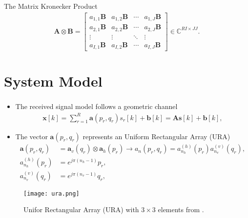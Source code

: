 \documentclass[10pt]{beamer}
\begin{document}
\begin{frame}[allowframebreaks]
    \framebreak
    \begin{block}{The Matrix Kronecker Product}
        \begin{align}
            \mathbf{A} \otimes \mathbf{B} =
            \begin{bmatrix}
                a_{1,1} \mathbf{B} & a_{1,2} \mathbf{B} & \cdots & a_{1,J} \mathbf{B} \\
                a_{2,1} \mathbf{B} & a_{2,2} \mathbf{B} & \cdots & a_{2,J} \mathbf{B} \\
                \vdots & \vdots & \ddots & \vdots \\
                a_{I,1} \mathbf{B} & a_{I,2} \mathbf{B} & \cdots & a_{I,J} \mathbf{B}
            \end{bmatrix}
            \in \mathbb{C}^{RI \times JJ}.
        \end{align}
    \end{block}
\end{frame}

\section{System Model}
\begin{frame}[allowframebreaks]
    \frametitle{\insertsection}
    \begin{itemize}
        \item The received signal model follows a geometric channel
            \begin{align}
                \boldsymbol{x}[k] = \sum^{R}_{r = 1} \boldsymbol{a}(p_{r},q_{r}) s_{r}[k] + \boldsymbol{b}[k] = \boldsymbol{A} \boldsymbol{s}[k] + \boldsymbol{b}[k],
            \end{align}
        \item The vector $\boldsymbol{a}(p_{r},q_{r})$ represents an Uniform Rectangular Array (URA)
            \begin{align}
                \boldsymbol{a}(p_{r},q_{r}) &= \boldsymbol{a}_{v}(q_{r}) \otimes \boldsymbol{a}_{h}(p_{r}) \rightarrow a_{n}(p_{r},q_{r}) = a^{(h)}_{n_{h}} (p_r) a^{(v)}_{n_{v}} (q_r), \\
                a^{(h)}_{n_{h}} (p_r) &= e^{j \pi (n_{h} - 1)}p_{r}, \\
                a^{(v)}_{n_{v}} (q_r) &= e^{j \pi (n_{v} - 1)}q_{r},
            \end{align}
    \end{itemize}
    \begin{figure}
        \centering 
        \texttt{[image: ura.png]}
        \caption{Unifor Rectangular Array (URA) with $3 \times 3$ elements from \cite{ribeiroseparable}.}
        \label{fig:ura} 
    \end{figure}
\end{frame}
\end{document}
